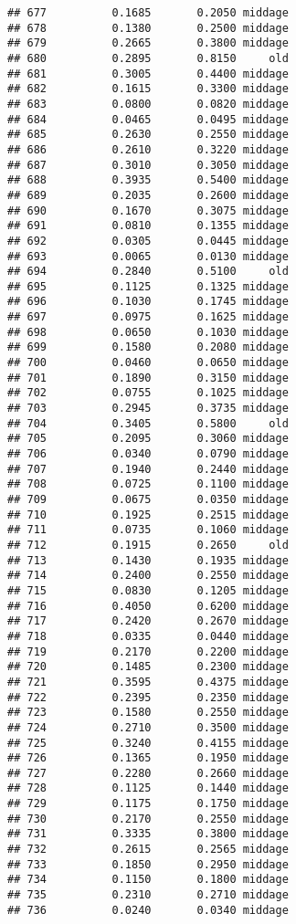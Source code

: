 \documentclass[
]{article}
\begin{document}
\begin{verbatim}
## 677          0.1685       0.2050 middage
## 678          0.1380       0.2500 middage
## 679          0.2665       0.3800 middage
## 680          0.2895       0.8150     old
## 681          0.3005       0.4400 middage
## 682          0.1615       0.3300 middage
## 683          0.0800       0.0820 middage
## 684          0.0465       0.0495 middage
## 685          0.2630       0.2550 middage
## 686          0.2610       0.3220 middage
## 687          0.3010       0.3050 middage
## 688          0.3935       0.5400 middage
## 689          0.2035       0.2600 middage
## 690          0.1670       0.3075 middage
## 691          0.0810       0.1355 middage
## 692          0.0305       0.0445 middage
## 693          0.0065       0.0130 middage
## 694          0.2840       0.5100     old
## 695          0.1125       0.1325 middage
## 696          0.1030       0.1745 middage
## 697          0.0975       0.1625 middage
## 698          0.0650       0.1030 middage
## 699          0.1580       0.2080 middage
## 700          0.0460       0.0650 middage
## 701          0.1890       0.3150 middage
## 702          0.0755       0.1025 middage
## 703          0.2945       0.3735 middage
## 704          0.3405       0.5800     old
## 705          0.2095       0.3060 middage
## 706          0.0340       0.0790 middage
## 707          0.1940       0.2440 middage
## 708          0.0725       0.1100 middage
## 709          0.0675       0.0350 middage
## 710          0.1925       0.2515 middage
## 711          0.0735       0.1060 middage
## 712          0.1915       0.2650     old
## 713          0.1430       0.1935 middage
## 714          0.2400       0.2550 middage
## 715          0.0830       0.1205 middage
## 716          0.4050       0.6200 middage
## 717          0.2420       0.2670 middage
## 718          0.0335       0.0440 middage
## 719          0.2170       0.2200 middage
## 720          0.1485       0.2300 middage
## 721          0.3595       0.4375 middage
## 722          0.2395       0.2350 middage
## 723          0.1580       0.2550 middage
## 724          0.2710       0.3500 middage
## 725          0.3240       0.4155 middage
## 726          0.1365       0.1950 middage
## 727          0.2280       0.2660 middage
## 728          0.1125       0.1440 middage
## 729          0.1175       0.1750 middage
## 730          0.2170       0.2550 middage
## 731          0.3335       0.3800 middage
## 732          0.2615       0.2565 middage
## 733          0.1850       0.2950 middage
## 734          0.1150       0.1800 middage
## 735          0.2310       0.2710 middage
## 736          0.0240       0.0340 middage

\end{verbatim}
\end{document}
